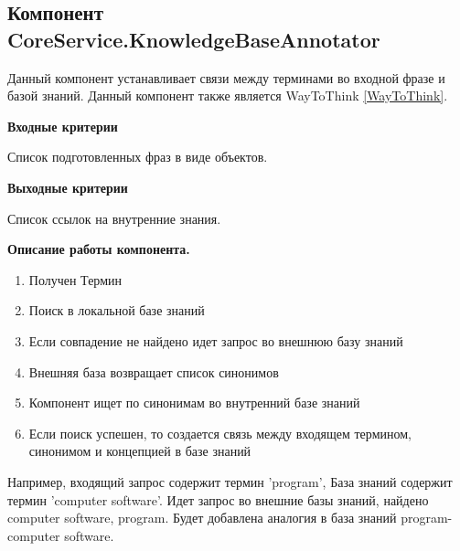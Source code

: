 \subsection{Компонент CoreService.KnowledgeBaseAnnotator} \label{KnowledgeBaseAnnotator}
Данный компонент устанавливает связи между терминами во входной фразе и базой знаний. Данный компонент также является WayToThink \ref{WayToThink}.  \par
 \textbf{Входные критерии} \par
Список подготовленных фраз в виде объектов. \par
\textbf{Выходные критерии} \par
Список ссылок на внутренние знания. \par
\textbf{Описание работы компонента.} \par
\begin{enumerate}
	\item Получен Термин
	\item Поиск в локальной базе знаний
	\item Если совпадение не найдено идет запрос во внешнюю базу знаний
	\item Внешняя база возвращает список синонимов
	\item Компонент ищет по синонимам во внутренний базе знаний
	\item Если поиск успешен, то создается связь между входящем термином, синонимом и концепцией в базе знаний
\end{enumerate}
Например, входящий запрос содержит термин 'program', База знаний содержит термин 'computer software'. Идет запрос во внешние базы знаний, найдено computer software, program. Будет добавлена аналогия в база знаний program-computer software. 

\clearpage
